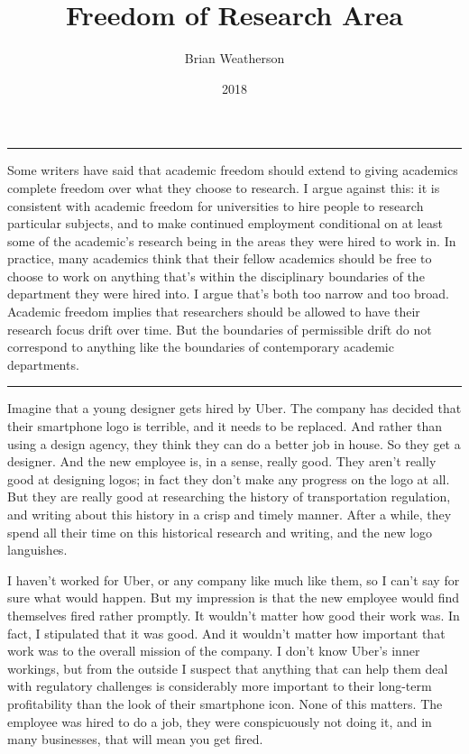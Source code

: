 \documentclass[
  10pt,
  letterpaper,
  DIV=11,
  numbers=noendperiod,
  twoside]{scrartcl}
\title{Freedom of Research Area}
\author{Brian Weatherson}
\date{2018}
\renewenvironment{abstract}
 {\vspace{-1.25cm}
 \quotation\small\noindent\rule{\linewidth}{.5pt}\par\smallskip
 \noindent }
 {\par\noindent\rule{\linewidth}{.5pt}\endquotation}
\begin{document}
\maketitle
\begin{abstract}
Some writers have said that academic freedom should extend to giving
academics complete freedom over what they choose to research. I argue
against this: it is consistent with academic freedom for universities to
hire people to research particular subjects, and to make continued
employment conditional on at least some of the academic's research being
in the areas they were hired to work in. In practice, many academics
think that their fellow academics should be free to choose to work on
anything that's within the disciplinary boundaries of the department
they were hired into. I argue that's both too narrow and too broad.
Academic freedom implies that researchers should be allowed to have
their research focus drift over time. But the boundaries of permissible
drift do not correspond to anything like the boundaries of contemporary
academic departments.
\end{abstract}


Imagine that a young designer gets hired by Uber. The company has
decided that their smartphone logo is terrible, and it needs to be
replaced. And rather than using a design agency, they think they can do
a better job in house. So they get a designer. And the new employee is,
in a sense, really good. They aren't really good at designing logos; in
fact they don't make any progress on the logo at all. But they are
really good at researching the history of transportation regulation, and
writing about this history in a crisp and timely manner. After a while,
they spend all their time on this historical research and writing, and
the new logo languishes.

I haven't worked for Uber, or any company like much like them, so I
can't say for sure what would happen. But my impression is that the new
employee would find themselves fired rather promptly. It wouldn't matter
how good their work was. In fact, I stipulated that it was good. And it
wouldn't matter how important that work was to the overall mission of
the company. I don't know Uber's inner workings, but from the outside I
suspect that anything that can help them deal with regulatory challenges
is considerably more important to their long-term profitability than the
look of their smartphone icon. None of this matters. The employee was
hired to do a job, they were conspicuously not doing it, and in many
businesses, that will mean you get fired.
\end{document}

